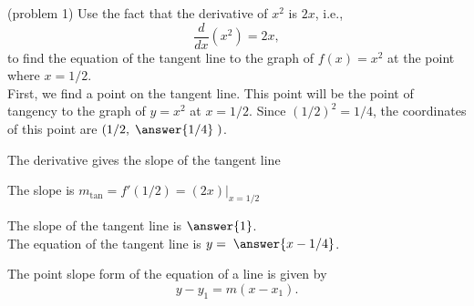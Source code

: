\documentclass{ximera}
\begin{document}
\begin{problem}(problem 1)
Use the fact that the derivative of $x^2$ is $2x$,
i.e., 
\[
\frac{d}{dx}\left( x^2 \right) = 2x,
\]
to find the equation of the tangent line to the graph of 
$f(x) = x^2$ at the point where $x = 1/2$.\\
First, we find a point on the tangent line. This point will be the point of tangency to the graph of $y = x^2$
at $x = 1/2$. Since $(1/2)^2 = 1/4$, the coordinates of this point are $(1/2,\; \answer{1/4}\;)$.
\begin{hint}
The derivative gives the slope of the tangent line
\end{hint}
\begin{hint}
The slope is $m_{\text{tan}} = f'(1/2) = (2x)\big|_{x=1/2}$
\end{hint}
The slope of the tangent line is $\answer{1}$.\\
The equation of the tangent line is $y = \; \answer{x - 1/4}$.
\begin{hint}
The point slope form of the equation of a line is given by
\[
 y - y_1 = m(x - x_1).
 \]
 \end{hint}
 
\end{problem}




\end{document}

